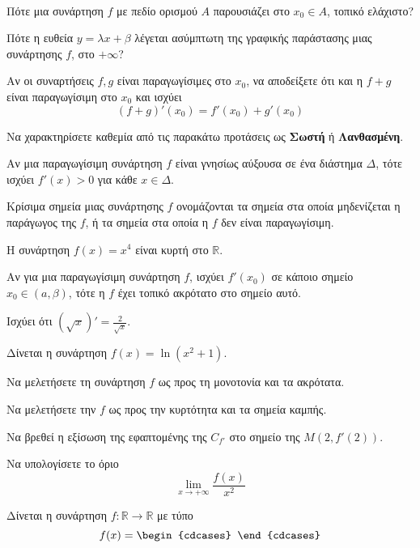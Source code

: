 \documentclass[11pt,a4paper]{article}
\begin{document}
\begin{thema}
\item\mbox{}\\\vspace{-5mm}
\begin{erwthma}
\item Πότε μια συνάρτηση $f$ με πεδίο ορισμού $A$ παρουσιάζει στο $x_0\in A$, τοπικό ελάχιστο?
\item Πότε η ευθεία $y=\lambda x+\beta$ λέγεται ασύμπτωτη της γραφικής παράστασης μιας συνάρτησης $f$, στο $+\infty$?
\item Αν οι συναρτήσεις $f,g$ είναι παραγωγίσιμες στο $x_0$, να αποδείξετε ότι και η $f+g$ είναι παραγωγίσιμη στο $x_0$ και ισχύει
\[ (f+g)'(x_0)=f'(x_0)+g'(x_0) \]
\item Να χαρακτηρίσετε καθεμία από τις παρακάτω προτάσεις ως \textbf{Σωστή} ή \textbf{Λανθασμένη}.
\begin{alist}
\item Αν μια παραγωγίσιμη συνάρτηση $f$ είναι γνησίως αύξουσα σε ένα διάστημα $\varDelta$, τότε ισχύει $f'(x)>0$ για κάθε $x\in\varDelta$.
\item Κρίσιμα σημεία μιας συνάρτησης $f$ ονομάζονται τα σημεία στα οποία μηδενίζεται η παράγωγος της $f$, ή τα σημεία στα οποία η $f$ δεν είναι παραγωγίσιμη.
\item Η συνάρτηση $f(x)=x^4$ είναι κυρτή στο $\mathbb{R}$.
\item Αν για μια παραγωγίσιμη συνάρτηση $f$, ισχύει $f'(x_0)$ σε κάποιο σημείο $x_0\in(a,\beta)$, τότε η $f$ έχει τοπικό ακρότατο στο σημείο αυτό.
\item Ισχύει ότι $\left(\sqrt{x}\right)'=\frac{2}{\sqrt{x}}$.
\end{alist}
\end{erwthma}
\item Δίνεται η συνάρτηση $f(x)=\ln{\left(x^2+1\right)}$.
\begin{erwthma}
\item Να μελετήσετε τη συνάρτηση $f$ ως προς τη μονοτονία και τα ακρότατα.
\item Να μελετήσετε την $f$ ως προς την κυρτότητα και τα σημεία καμπής.
\item Να βρεθεί η εξίσωση της εφαπτομένης της $C_{f'}$ στο σημείο της $M(2,f'(2))$.
\item Να υπολογίσετε το όριο
\[ \lim_{x\to+\infty}{\frac{f(x)}{x^2}} \]
\end{erwthma}
\item Δίνεται η συνάρτηση $f:\mathbb{R}\to\mathbb{R}$ με τύπο
\[ f(x)=\begin{cdcases}

\end{cdcases}\]
\end{thema}
\end{document}
